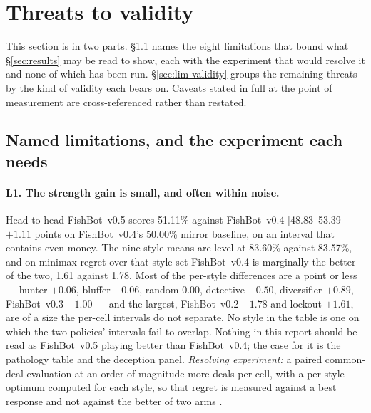 \documentclass[11pt]{article}
\theoremstyle{definition}
\DeclareRobustCommand{\vfive}{\texorpdfstring{\mbox{FishBot v0.5}}{FishBot v0.5}}
\DeclareRobustCommand{\vfour}{\texorpdfstring{\mbox{FishBot v0.4}}{FishBot v0.4}}
\DeclareRobustCommand{\vthree}{\texorpdfstring{\mbox{FishBot v0.3}}{FishBot v0.3}}
\DeclareRobustCommand{\vtwo}{\texorpdfstring{\mbox{FishBot v0.2}}{FishBot v0.2}}
\providecommand{\numStyleCIVfour}{48.83--53.39}
\providecommand{\numPanelVfiveVfour}{51.11}
\providecommand{\numDeltaVfour}{+1.11}
\providecommand{\numDeltaVthree}{-1.00}
\providecommand{\numDeltaVtwo}{-1.78}
\providecommand{\numDeltaLockout}{+1.61}
\providecommand{\numDeltaDiversifier}{+0.89}
\providecommand{\numDeltaHunter}{+0.06}
\providecommand{\numDeltaBluffer}{-0.06}
\providecommand{\numDeltaRandom}{0.00}
\providecommand{\numVfiveMean}{83.60}
\providecommand{\numVfourMean}{83.57}
\providecommand{\numVfiveRegret}{1.78}
\providecommand{\numVfourRegret}{1.61}
\providecommand{\numPanelVfourVfour}{50.00}
\providecommand{\numDeltaDetective}{-0.50}
\begin{document}
\section{Threats to validity}
\label{sec:limitations}

This section is in two parts. \S\ref{sec:lim-named} names the eight limitations
that bound what \S\ref{sec:results} may be read to show, each with the experiment
that would resolve it and none of which has been run. \S\ref{sec:lim-validity}
groups the remaining threats by the kind of validity each bears on. Caveats
stated in full at the point of measurement are cross-referenced rather than
restated.

\subsection{Named limitations, and the experiment each needs}
\label{sec:lim-named}

\paragraph{L1. The strength gain is small, and often within noise.}
Head to head \vfive{} scores \numPanelVfiveVfour\% against \vfour{}
[\numStyleCIVfour] --- $\numDeltaVfour$ points on \vfour{}'s
\numPanelVfourVfour\% mirror baseline, on an interval that contains even money.
The nine-style means are level at \numVfiveMean\% against
\numVfourMean\%, and on minimax regret over that style set \vfour{} is
marginally the better of the two, \numVfourRegret{} against \numVfiveRegret{}.
Most of the per-style differences are a point or
less --- hunter $\numDeltaHunter$, bluffer $\numDeltaBluffer$, random
$\numDeltaRandom$, detective $\numDeltaDetective$, diversifier
$\numDeltaDiversifier$, \vthree{} $\numDeltaVthree$ --- and the largest,
\vtwo{} $\numDeltaVtwo$ and lockout $\numDeltaLockout$, are of a size the
per-cell intervals do not separate. No style in the table is one on which the
two policies' intervals fail to overlap. Nothing in this report should be read as
\vfive{} playing better than \vfour{}; the case for it is the pathology table
and the deception panel. \emph{Resolving experiment:} a paired common-deal
evaluation at an order of magnitude more deals per cell, with a per-style
optimum computed for each style, so that regret is measured against a best
response and not against the better of two arms \cite{xu-mirror}.
\end{document}
